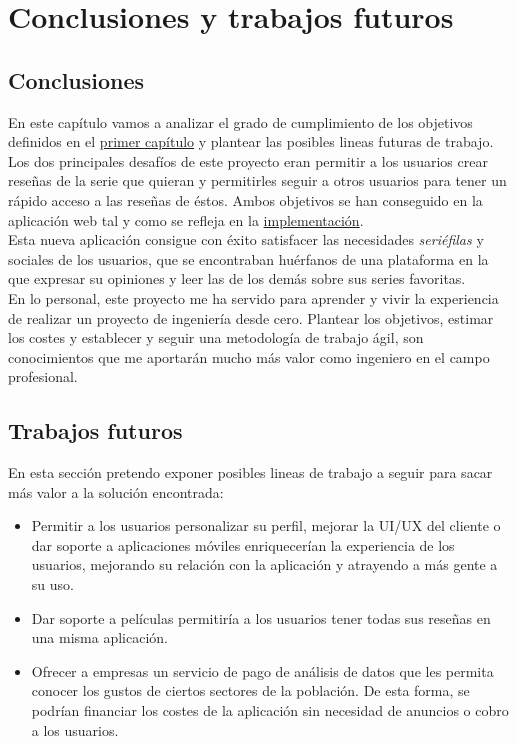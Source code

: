 \chapter{Conclusiones y trabajos futuros}
\section{Conclusiones}
En este capítulo vamos a analizar el grado de cumplimiento de los objetivos definidos en el
\hyperref[sec:objetivo]{primer capítulo} y plantear las posibles lineas futuras de trabajo.\\

Los dos principales desafíos de este proyecto eran permitir a los usuarios crear reseñas de la serie que quieran y
permitirles seguir a otros usuarios para tener un rápido acceso a las reseñas de éstos. Ambos objetivos se han
conseguido en la aplicación web tal y como se refleja en la \hyperref[chap:implementación]{implementación}.\\

Esta nueva aplicación consigue con éxito satisfacer las necesidades \textit{seriéfilas} y sociales de los usuarios, que
se encontraban huérfanos de una plataforma en la que expresar su opiniones y leer las de los demás sobre sus series
favoritas.\\

En lo personal, este proyecto me ha servido para aprender y vivir la experiencia de realizar un proyecto de ingeniería
desde cero. Plantear los objetivos, estimar los costes y establecer y seguir una metodología de trabajo ágil, son
conocimientos que me aportarán mucho más valor como ingeniero en el campo profesional.

\section{Trabajos futuros}
En esta sección pretendo exponer posibles lineas de trabajo a seguir para sacar más valor a la solución encontrada:

\begin{itemize}
    \item Permitir a los usuarios personalizar su perfil, mejorar la UI/UX del cliente o dar soporte a aplicaciones
    móviles enriquecerían la experiencia de los usuarios, mejorando su relación con la aplicación y atrayendo a más
    gente a su uso.
    \item Dar soporte a películas permitiría a los usuarios tener todas sus reseñas en una misma aplicación.
    \item Ofrecer a empresas un servicio de pago de análisis de datos que les permita conocer los gustos de ciertos
    sectores de la población. De esta forma, se podrían financiar los costes de la aplicación sin necesidad de anuncios
    o cobro a los usuarios.
\end{itemize}
